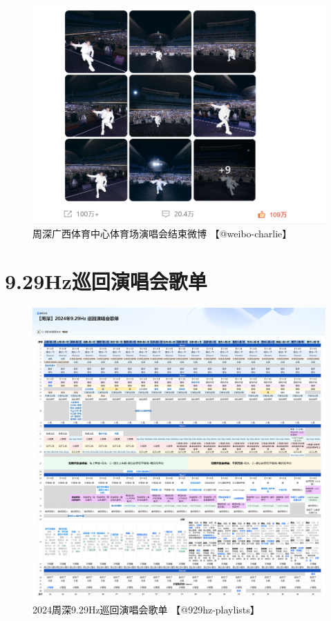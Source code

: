 \documentclass[]{ctexbook}
\begin{document}
\begin{figure}

{\centering \includegraphics{img/weibo/nanning-20241207-2} 

}

\caption{周深广西体育中心体育场演唱会结束微博 【@weibo-charlie】}\label{fig:unnamed-chunk-151}
\end{figure}

\appendix {}


\chapter{9.29Hz巡回演唱会歌单}\label{playlists}

\begin{figure}

{\centering \includegraphics{img/playlists/playlists} 

}

\caption{2024周深9.29Hz巡回演唱会歌单 【@929hz-playlists】}\label{fig:unnamed-chunk-153}
\end{figure}
\end{document}
